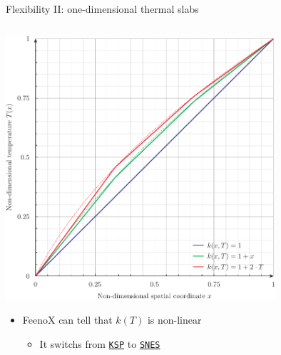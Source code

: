 \documentclass[
  ignorenonframetext,
  aspectratio=169,
]{beamer}
\newcommand{\passthrough}[1]{#1}
\providecommand{\tightlist}{%
  \setlength{\itemsep}{0pt}\setlength{\parskip}{0pt}}
\begin{document}
\begin{frame}[fragile]{Flexibility II: one-dimensional thermal slabs}
\begin{columns}[T]
\begin{column}{0.55\textwidth}
\centering \includegraphics[width=0.75\textwidth,height=\textheight]{thermal-slabs.pdf}

\begin{itemize}
\tightlist
\item
  FeenoX can tell that \(k(T)\) is non-linear

  \begin{itemize}
  \tightlist
  \item
    It switchs from
    \href{https://petsc.org/release/docs/manual/ksp/}{\passthrough{\lstinline!KSP!}}
    to
    \href{https://petsc.org/release/docs/manual/snes/}{\passthrough{\lstinline!SNES!}}
  \end{itemize}
\end{itemize}
\end{column}
\end{columns}
\end{frame}
\end{document}
